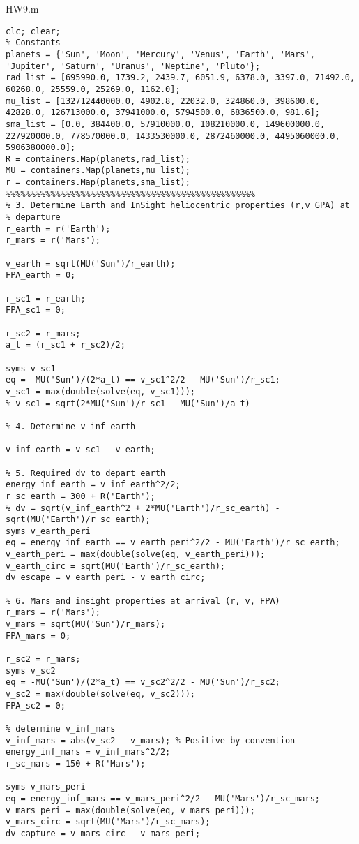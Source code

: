 HW9.m
\begin{lstlisting}[frame=lines,style=Matlab-editor,basicstyle = \mlttfamily]
clc; clear;
% Constants
planets = {'Sun', 'Moon', 'Mercury', 'Venus', 'Earth', 'Mars', 'Jupiter', 'Saturn', 'Uranus', 'Neptine', 'Pluto'};
rad_list = [695990.0, 1739.2, 2439.7, 6051.9, 6378.0, 3397.0, 71492.0, 60268.0, 25559.0, 25269.0, 1162.0];
mu_list = [132712440000.0, 4902.8, 22032.0, 324860.0, 398600.0, 42828.0, 126713000.0, 37941000.0, 5794500.0, 6836500.0, 981.6];
sma_list = [0.0, 384400.0, 57910000.0, 108210000.0, 149600000.0, 227920000.0, 778570000.0, 1433530000.0, 2872460000.0, 4495060000.0, 5906380000.0];
R = containers.Map(planets,rad_list);
MU = containers.Map(planets,mu_list);
r = containers.Map(planets,sma_list);
%%%%%%%%%%%%%%%%%%%%%%%%%%%%%%%%%%%%%%%%%%%%%%%%%%
% 3. Determine Earth and InSight heliocentric properties (r,v GPA) at
% departure
r_earth = r('Earth');
r_mars = r('Mars');

v_earth = sqrt(MU('Sun')/r_earth);
FPA_earth = 0;

r_sc1 = r_earth;
FPA_sc1 = 0;

r_sc2 = r_mars;
a_t = (r_sc1 + r_sc2)/2;

syms v_sc1
eq = -MU('Sun')/(2*a_t) == v_sc1^2/2 - MU('Sun')/r_sc1;
v_sc1 = max(double(solve(eq, v_sc1)));
% v_sc1 = sqrt(2*MU('Sun')/r_sc1 - MU('Sun')/a_t)

% 4. Determine v_inf_earth

v_inf_earth = v_sc1 - v_earth;

% 5. Required dv to depart earth
energy_inf_earth = v_inf_earth^2/2;
r_sc_earth = 300 + R('Earth');
% dv = sqrt(v_inf_earth^2 + 2*MU('Earth')/r_sc_earth) - sqrt(MU('Earth')/r_sc_earth);
syms v_earth_peri
eq = energy_inf_earth == v_earth_peri^2/2 - MU('Earth')/r_sc_earth;
v_earth_peri = max(double(solve(eq, v_earth_peri)));
v_earth_circ = sqrt(MU('Earth')/r_sc_earth);
dv_escape = v_earth_peri - v_earth_circ;

% 6. Mars and insight properties at arrival (r, v, FPA)
r_mars = r('Mars');
v_mars = sqrt(MU('Sun')/r_mars);
FPA_mars = 0;

r_sc2 = r_mars;
syms v_sc2
eq = -MU('Sun')/(2*a_t) == v_sc2^2/2 - MU('Sun')/r_sc2;
v_sc2 = max(double(solve(eq, v_sc2)));
FPA_sc2 = 0;

% determine v_inf_mars
v_inf_mars = abs(v_sc2 - v_mars); % Positive by convention
energy_inf_mars = v_inf_mars^2/2;
r_sc_mars = 150 + R('Mars');

syms v_mars_peri
eq = energy_inf_mars == v_mars_peri^2/2 - MU('Mars')/r_sc_mars;
v_mars_peri = max(double(solve(eq, v_mars_peri)));
v_mars_circ = sqrt(MU('Mars')/r_sc_mars);
dv_capture = v_mars_circ - v_mars_peri;
\end{lstlisting}
